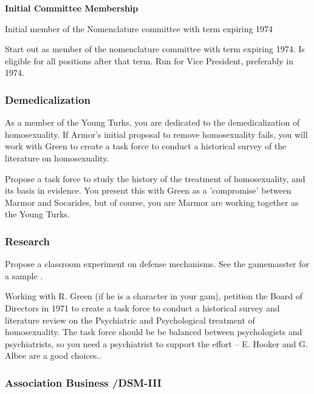 \begin{refsection}
\textbf{Initial Committee Membership}
\begin{service}[Spiegel]\label{service:spiegel}
Initial member of the Nomenclature committee with term expiring 1974
\end{service}

Start out as member of the nomenclature committee with term expiring 1974. Is eligible for all positions after that term. Run for Vice President, preferably in 1974.

\subsubsection{Demedicalization}
\label{demedicalization}

As a member of the Young Turks, you are dedicated to the demedicalization of homosexuality. If Armor’s initial proposal to remove homosexuality fails, you will work with Green to create a task force to conduct a historical survey of the literature on homosexuality. \begin{proposal}[Spiegel]\label{proposal:spiegel}
Propose a task force to study the history of the treatment of homosexuality, and its basis in evidence.  You present this with Green as a 'compromise' between Marmor and Socarides, but of course, you are Marmor are working together as the Young Turks.
\end{proposal}

\subsubsection{Research}
\label{research}

\begin{researchtask}[Spiegel]\label{researchtask:spiegel}Propose a classroom experiment on defense mechanisms. See the gamemasster for a sample .\end{researchtask}

Working with R. Green (if he is a character in your gam), petition the Board of Directors in 1971 to create a task force to conduct a historical survey and literature review on the Psychiatric and Psychological treatment of homosexuality. The task force should be be balanced between psychologists and psychiatrists, so you need a psychiatrist to support the effort – E. Hooker and G. Albee are a good choices..

\subsubsection{Association Business \slash  DSM-III}
\label{associationbusinessdsm-iii}


\end{refsection}
